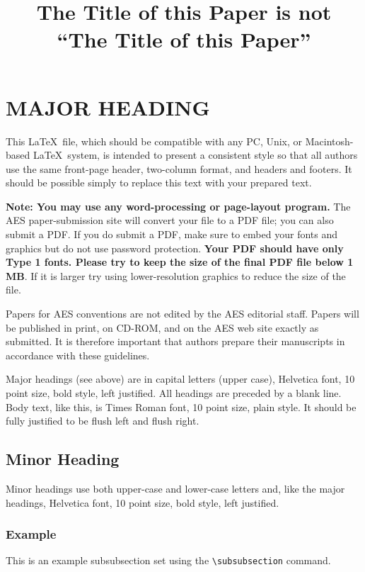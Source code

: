 \documentclass{aes130}
\affiliation[1]{BigCity College, City, ST, 00000, Country}
\affiliation[2]{Smallville State Technical Institute, Smallville, XR,
99999, Country}
\title{The Title of this Paper is not\\ ``The Title of this Paper''}
\begin{document}
\maketitle %


\section{MAJOR HEADING}
This \LaTeX\ file, which should be compatible with any PC, Unix, or
Macintosh-based \LaTeX\ system, is intended to present a consistent style so
that all authors use the same front-page header, two-column format,
and headers and footers. It should be possible simply to replace this text
with your prepared text.


\textbf{Note: You may use any word-processing or page-layout program.}
The AES paper-submission site will convert your file to a PDF file;
you can also submit a PDF. If you do submit a PDF, make sure to embed
your fonts and graphics but do not use password protection.
\textbf{Your PDF should have only Type 1 fonts. Please try to keep the
size of the final PDF file below 1 MB}. If it is larger try using
lower-resolution graphics to reduce the size of the file.

Papers for AES conventions are not edited by the AES editorial
staff. Papers will be published in print, on CD-ROM, and on the AES
web site exactly as submitted. It is therefore important that authors
prepare their manuscripts in accordance with these guidelines.

Major headings (see above) are in capital letters (upper case),
Helvetica font, 10 point size, bold style, left justified. All headings
are preceded by a blank line. Body text, like this, is Times Roman
font, 10 point size, plain style. It should be fully justified to be
flush left and flush right. 

\subsection{Minor Heading}
Minor headings use both upper-case and lower-case letters and, like
the major headings, Helvetica font, 10 point size, bold style, left
justified.

\subsubsection{Example}
This is an example subsubsection set using the \verb|\subsubsection|
command. 
\end{document}
